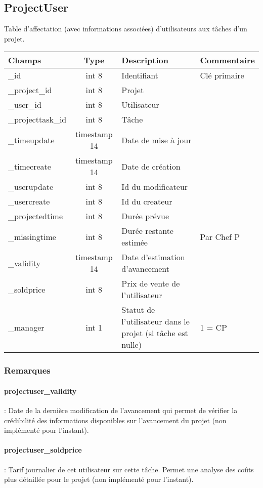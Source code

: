 \subsection{ProjectUser}
Table d'affectation (avec informations associées) d'utilisateurs aux tâches d'un projet.

\begin{tabular}{|p{3cm}|c|p{5.4cm}|p{2.6cm}|}
\hline
\textbf{Champs} & \textbf{Type} & \textbf{Description} & \textbf{Commentaire} \\
\hline
\_id & int 8 & Identifiant & Clé primaire \\
\hline
\_project\_id & int 8 & Projet & \\
\hline
\_user\_id & int 8 & Utilisateur & \\
\hline
\_projecttask\_id & int 8 & Tâche & \\
\hline
\_timeupdate & timestamp 14 & Date de mise à jour & \\
\hline
\_timecreate & timestamp 14 & Date de création & \\
\hline
\_userupdate & int 8 & Id du modificateur & \\
\hline
\_usercreate & int 8 & Id du createur & \\
\hline
\_projectedtime & int 8 & Durée prévue & \\
\hline
\_missingtime & int 8 & Durée restante estimée & Par Chef P \\
\hline
\_validity & timestamp 14 & Date d'estimation d'avancement & \\
\hline
\_soldprice & int 8 & Prix de vente de l'utilisateur & \\
\hline
\_manager & int 1 & Statut de l'utilisateur dans le projet (si tâche est nulle) & 1 = CP \\
\hline
\end{tabular}

\subsubsection{Remarques}

\paragraph{projectuser\_validity} : Date de la dernière modification de l'avancement qui permet de vérifier la crédibilité des informations disponibles sur l'avancement du projet (non implémenté pour l'instant).
\paragraph{projectuser\_soldprice} : Tarif journalier de cet utilisateur sur cette tâche. Permet une analyse des coûts plus détaillée pour le projet (non implémenté pour l'instant).
